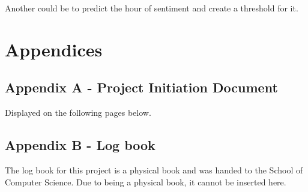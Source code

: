 \documentclass[oneside, 10pt]{article}
\begin{document}
		Another could be to predict the hour of sentiment and create a threshold for it.
		
	\newpage
	
	\nocite{*}
	\printbibliography
	
	\newpage
	\section{Appendices}
		\subsection{Appendix A - Project Initiation Document}
		Displayed on the following pages below.
		
		\subsection{Appendix B - Log book}
		The log book for this project is a physical book and was handed to the School of Computer Science. Due to being a physical book, it cannot be inserted here.
	
\end{document}
